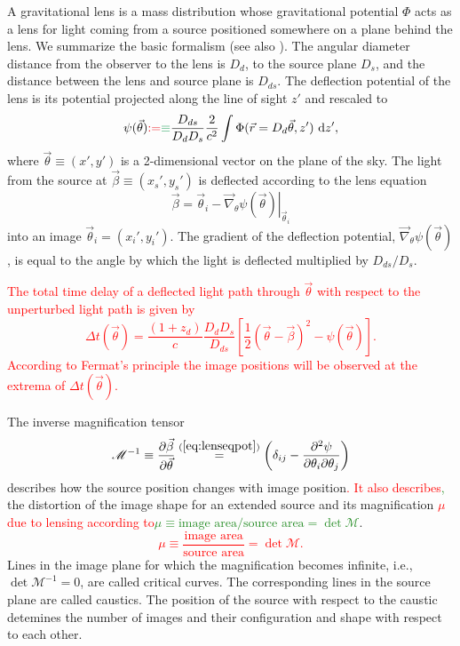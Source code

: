 \documentclass[useAMS,usenatbib]{mnras}
\newcommand{\vect}[1]{\vec{#1}} %
\newcommand{\NEW}[1]{\textcolor{ForestGreen}{#1}}
\newcommand{\OLD}[1]{\textcolor{Red}{#1}}
\begin{document}
A gravitational lens is a mass distribution whose gravitational potential $\Phi$ acts as a lens for light coming from a source positioned somewhere on a plane behind the lens. We summarize the basic formalism (see also \citealt{1992grle.book.....S,1996astro.ph..6001N,2006glsw.conf....1S,2006glsw.conf...91K,2010ARA&A..48...87T}). The angular diameter distance from the observer to the lens is $D_d$, to the source plane $D_s$, and the distance between the lens and source plane is $D_{ds}$. The deflection potential of the lens is its potential projected along the line of sight $z'$ and rescaled to
\begin{equation}
\psi(\vect{\theta}) \OLD{:=}\NEW{\equiv} \frac{D_{ds}}{D_d D_s} \frac{2}{c^2} \int \Phi(\vect{r}=D_d \vect{\theta},z') {\ \mathrm d} z', \label{eq:psidef}
\end{equation}
where $\vect{\theta}\equiv(x',y')$ is a 2-dimensional vector on the plane of the sky. The light from the source at $\vect{\beta} \equiv (x_s',y_s')$ is deflected according to the lens equation
\begin{equation}
\vect{\beta} = \vect{\theta}_i - \left.\vect{\nabla}_\theta \psi(\vect{\theta})\right|_{\vect{\theta}_i} \label{eq:lenseqpot}
\end{equation}
into an image $\vect{\theta}_i = (x_i',y_i')$. The gradient of the deflection potential, $\vect{\nabla}_\theta \psi(\vect{\theta})$, is equal to the angle by which the light is deflected multiplied by $D_{ds}/D_{s}$.

\OLD{The total time delay of a deflected light path through $\vect{\theta}$ with respect to the unperturbed light path is given by 
\begin{equation}
\Delta t(\vect{\theta}) = \frac{(1+z_d)}{c} \frac{D_d D_s}{D_{ds}} \left[ \frac 12 (\vect{\theta} - \vect{\beta})^2 - \psi(\vect{\theta})\right]. \label{eq:timedelay}
\end{equation}
 According to Fermat's principle the image positions will be observed at the extrema of $\Delta t(\vect{\theta})$.}

The inverse magnification tensor
\begin{equation}
\mathscr{M}^{-1} \equiv \frac{\partial \vect{\beta}}{\partial \vect{\theta}} \overset{(\ref{eq:lenseqpot})}{=} \left(\delta_{ij} - \frac{\partial^2 \psi}{\partial \theta_i \partial \theta_j} \right)\label{eq:magnificationtensor}
\end{equation}
describes how the source position changes with image position\OLD{. It also describes}\NEW{,} the distortion of the image shape for an extended source and its magnification \OLD{$\mu$ due to lensing according to}\NEW{$\mu \equiv \text{image area}/\text{source area} = \det \mathscr{M}$}.
\OLD{$$\mu \equiv \frac{\text{image area}}{\text{source area}} = \det \mathscr{M}.$$}
Lines in the image plane for which the magnification becomes infinite, i.e., $\det \mathscr{M}^{-1} = 0$, are called critical curves. The corresponding lines in the source plane are called caustics. The position of the source with respect to the caustic detemines the number of images and their configuration and shape with respect to each other.
\end{document}
